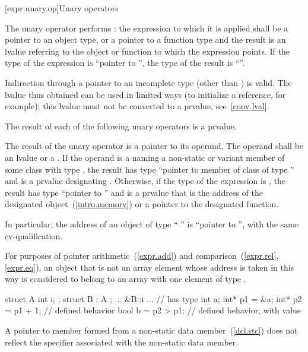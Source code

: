 [expr.unary.op]{Unary operators}

\pnum
{}%
%
The unary \tcode{*} operator performs :
%
the expression to which it is applied shall be a pointer to an object
type, or a pointer to a function type and the result is an lvalue
referring to the object or function to which the expression points. If
the type of the expression is ``pointer to '', the type of the
result is ``''.
\begin{note}
%
Indirection through a pointer to an incomplete type (other than
 ) is valid. The lvalue thus obtained can be
used in limited ways (to initialize a reference, for example); this
lvalue must not be converted to a prvalue, see~\ref{conv.lval}.
\end{note}

\pnum
The result of each of the following unary operators is a prvalue.

\pnum
{}%
%
The result of the unary \tcode{\&} operator is a pointer to its operand.
The operand shall be an lvalue or a .
If the operand is a  naming a non-static or variant member 
of some class  with type , the result has type ``pointer to member
of class  of type '' and is a prvalue designating .
Otherwise, if the type of the expression is , the result has type ``pointer to
'' and is a prvalue that is the address of the designated object~(\ref{intro.memory})
or a pointer to the designated function. \begin{note} In particular, the address of an
object of type ``\cv{} '' is ``pointer to \cv{} '', with the same
cv-qualification. \end{note}
For purposes of pointer arithmetic~(\ref{expr.add}) and
comparison~(\ref{expr.rel}, \ref{expr.eq}),
an object that is not an array element whose
address is taken in this way is considered to belong to an array with one
element of type .
\begin{example}

\begin{codeblock}
struct A { int i; };
struct B : A { };
... &B::i ...       // has type 
int a;
int* p1 = &a;
int* p2 = p1 + 1;   // defined behavior
bool b = p2 > p1;   // defined behavior, with value 
\end{codeblock}
\end{example}
\begin{note}
A pointer to member formed from a  non-static data
member~(\ref{dcl.stc}) does not reflect the  specifier
associated with the non-static data member.
\end{note}

